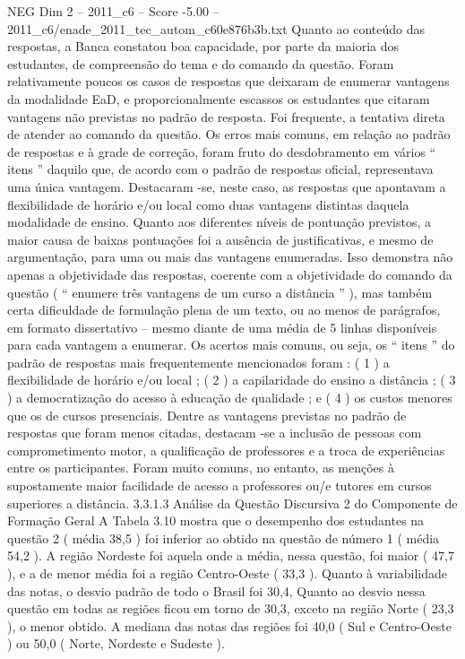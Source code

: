 \begin{textsample}{NEG Dim 2 – 2011\_c6 – Score -5.00 – 2011\_c6/enade\_2011\_tec\_autom\_c60e876b3b.txt}
Quanto ao conteúdo das respostas, a Banca constatou boa capacidade, por parte da maioria dos estudantes, de compreensão do tema e do comando da questão.
Foram relativamente poucos os casos de respostas que deixaram de enumerar vantagens da modalidade EaD, e proporcionalmente escassos os estudantes que citaram vantagens não previstas no padrão de resposta.
Foi frequente, a tentativa direta de atender ao comando da questão.
Os erros mais comuns, em relação ao padrão de respostas e à grade de correção, foram fruto do desdobramento em vários “ itens ” daquilo que, de acordo com o padrão de respostas oficial, representava uma única vantagem.
Destacaram -se, neste caso, as respostas que apontavam a flexibilidade de horário e/ou local como duas vantagens distintas daquela modalidade de ensino.
Quanto aos diferentes níveis de pontuação previstos, a maior causa de baixas pontuações foi a ausência de justificativas, e mesmo de argumentação, para uma ou mais das vantagens enumeradas.
Isso demonstra não apenas a objetividade das respostas, coerente com a objetividade do comando da questão ( “ enumere três vantagens de um curso a distância ” ), mas também certa dificuldade de formulação plena de um texto, ou ao menos de parágrafos, em formato dissertativo – mesmo diante de uma média de 5 linhas disponíveis para cada vantagem a enumerar.
Os acertos mais comuns, ou seja, os “ itens ” do padrão de respostas mais frequentemente mencionados foram : ( 1 ) a flexibilidade de horário e/ou local ; ( 2 ) a capilaridade do ensino a distância ; ( 3 ) a democratização do acesso à educação de qualidade ; e ( 4 ) os custos menores que os de cursos presenciais.
Dentre as vantagens previstas no padrão de respostas que foram menos citadas, destacam -se a inclusão de pessoas com comprometimento motor, a qualificação de professores e a troca de experiências entre os participantes.
Foram muito comuns, no entanto, as menções à supostamente maior facilidade de acesso a professores ou/e tutores em cursos superiores a distância. 3.3.1.3 Análise da Questão Discursiva 2 do Componente de Formação Geral A Tabela 3.10 mostra que o desempenho dos estudantes na questão 2 ( média 38,5 ) foi inferior ao obtido na questão de número 1 ( média 54,2 ).
A região Nordeste foi aquela onde a média, nessa questão, foi maior ( 47,7 ), e a de menor média foi a região Centro-Oeste ( 33,3 ).
Quanto à variabilidade das notas, o desvio padrão de todo o Brasil foi 30,4, Quanto ao desvio nessa questão em todas as regiões ficou em torno de 30,3, exceto na região Norte ( 23,3 ), o menor obtido.
A mediana das notas das regiões foi 40,0 ( Sul e Centro-Oeste ) ou 50,0 ( Norte, Nordeste e Sudeste ).

\end{textsample}
